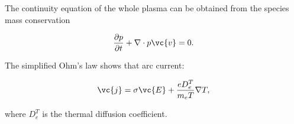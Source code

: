 The continuity equation of the whole plasma can be obtained from the species mass conservation

\begin{equation}
	\frac{\partial p}{\partial t} + \nabla \cdot p \vc{v} = 0.
\end{equation}

The simplified Ohm's law shows that arc current:

\begin{equation}
	\vc{j} = \sigma \vc{E} + \frac{e D_e^T}{m_e T} \nabla T,
\end{equation}

where $D_e^T$ is the thermal diffusion coefficient.